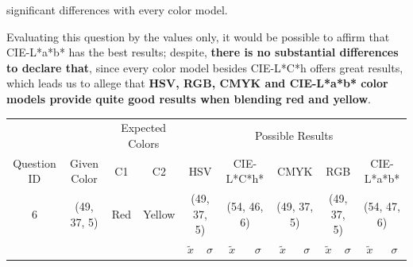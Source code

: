 significant differences with every color model. \par
%
Evaluating this question by the values only, it would be possible to affirm that CIE-L*a*b* has the best results; despite, \textbf{there is no substantial differences to declare that}, since
every color model besides CIE-L*C*h offers great results, which leads us to allege that \textbf{HSV, RGB, CMYK and CIE-L*a*b* color models provide quite good results when blending red and yellow}.
%
\begin{table}[H]
  \resizebox{\textwidth}{!} {
  \begin{tabular}{lccccccccccccc}
    \hline
    \multicolumn{1}{c}{}                              &                                      & \multicolumn{2}{c}{Expected Colors}                   & \multicolumn{10}{c}{Possible Results}                                                                                                                                                                                                                                                                                        \\ \cline{3-14}
    \multicolumn{1}{c}{\multirow{-2}{*}{Question ID}} & \multirow{-2}{*}{Given Color}        & C1                       & C2                         & \multicolumn{2}{c}{HSV}                                        & \multicolumn{2}{c}{CIE-L*C*h*}                                 & \multicolumn{2}{c}{CMYK}                                       & \multicolumn{2}{c}{RGB}                                        & \multicolumn{2}{c}{CIE-L*a*b*}                                 \\ \hline
    \multicolumn{1}{c}{6}                             & \cellcolor[HTML]{FF8000}(49, 37, 5) & \multicolumn{1}{c|}{Red} & \multicolumn{1}{c|}{Yellow}  & \multicolumn{2}{c|}{\cellcolor[HTML]{FF8000}(49, 37, 5)}      & \multicolumn{2}{c|}{\cellcolor[HTML]{FF9F00}(54, 46, 6)}       & \multicolumn{2}{c|}{\cellcolor[HTML]{FF8000}(49, 37, 5)}       & \multicolumn{2}{c|}{\cellcolor[HTML]{FF8000}(49, 37, 5)}       & \multicolumn{2}{c|}{\cellcolor[HTML]{FFA100}(54, 47, 6)}       \\ \hline
                                                      & \multicolumn{1}{l}{}                 & \multicolumn{1}{l}{}     & \multicolumn{1}{l}{}       & \multicolumn{1}{c}{$\tilde{x}$} & \multicolumn{1}{c}{$\sigma$} & \multicolumn{1}{c}{$\tilde{x}$} & \multicolumn{1}{c}{$\sigma$} & \multicolumn{1}{c}{$\tilde{x}$} & \multicolumn{1}{c}{$\sigma$} & \multicolumn{1}{c}{$\tilde{x}$} & \multicolumn{1}{c}{$\sigma$} & \multicolumn{1}{c}{$\tilde{x}$} & \multicolumn{1}{c}{$\sigma$} \\ \hline

\end{tabular}}
\end{table}

